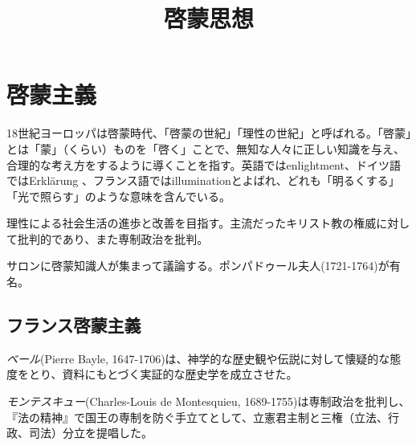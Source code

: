 \documentclass[uplatex,dvipdfmx]{jsarticle} \usepackage{mystyle}%
\title{啓蒙思想}
\begin{document}
\maketitle
\else\chapter{啓蒙主義}\fi

\label{cha:enlightment}



18世紀ヨーロッパは啓蒙時代、「啓蒙の世紀」「理性の世紀」と呼ばれる。「啓蒙」とは「蒙」（くらい）ものを「啓く」ことで、無知な人々に正しい知識を与え、合理的な考え方をするように導くことを指す。英語ではenlightment、ドイツ語ではErkl{\"a}rung 、フランス語ではilluminationとよばれ、どれも「明るくする」「光で照らす」のような意味を含んでいる。

理性による社会生活の進歩と改善を目指す。主流だったキリスト教の権威に対して批判的であり、また専制政治を批判。

サロンに啓蒙知識人が集まって議論する。ポンパドゥール夫人(1721-1764)が有名。













\section{フランス啓蒙主義}

\emph{ベール}(Pierre Bayle, 1647-1706)は、神学的な歴史観や伝説に対して懐疑的な態度をとり、資料にもとづく実証的な歴史学を成立させた。

\emph{モンテスキュー}(Charles-Louis de Montesquieu, 1689-1755)は専制政治を批判し、『法の精神』で国王の専制を防ぐ手立てとして、立憲君主制と三権（立法、行政、司法）分立を提唱した。
\end{document}
